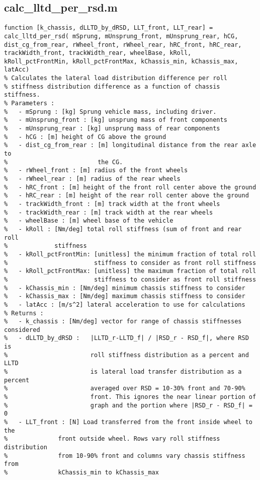 		\subsection{calc\_lltd\_per\_rsd.m}
\begin{lstlisting}
function [k_chassis, dLLTD_by_dRSD, LLT_front, LLT_rear] =  calc_lltd_per_rsd( mSprung, mUnsprung_front, mUnsprung_rear, hCG, dist_cg_from_rear, rWheel_front, rWheel_rear, hRC_front, hRC_rear, trackWidth_front, trackWidth_rear, wheelBase, kRoll, kRoll_pctFrontMin, kRoll_pctFrontMax, kChassis_min, kChassis_max, latAcc)
% Calculates the lateral load distribution difference per roll
% stiffness distribution difference as a function of chassis stiffness.
% Parameters :
%   - mSprung : [kg] Sprung vehicle mass, including driver.
%   - mUnsprung_front : [kg] unsprung mass of front components
%   - mUnsprung_rear : [kg] unsprung mass of rear components
%   - hCG : [m] height of CG above the ground
%   - dist_cg_from_rear : [m] longitudinal distance from the rear axle to
%                         the CG.
%   - rWheel_front : [m] radius of the front wheels
%   - rWheel_rear : [m] radius of the rear wheels
%   - hRC_front : [m] height of the front roll center above the ground
%   - hRC_rear : [m] height of the rear roll center above the ground
%   - trackWidth_front : [m] track width at the front wheels
%   - trackWidth_rear : [m] track width at the rear wheels
%   - wheelBase : [m] wheel base of the vehicle
%   - kRoll : [Nm/deg] total roll stiffness (sum of front and rear roll
%             stiffness
%   - kRoll_pctFrontMin: [unitless] the minimum fraction of total roll
%                        stiffness to consider as front roll stiffness
%   - kRoll_pctFrontMax: [unitless] the maximum fraction of total roll
%                        stiffness to consider as front roll stiffness
%   - kChassis_min : [Nm/deg] minimum chassis stiffness to consider
%   - kChassis_max : [Nm/deg] maximum chassis stiffness to consider
%   - latAcc : [m/s^2] lateral acceleration to use for calculations
% Returns :
%   - k_chassis : [Nm/deg] vector for range of chassis stiffnesses considered
%   - dLLTD_by_dRSD :   |LLTD_r-LLTD_f| / |RSD_r - RSD_f|, where RSD is
%                       roll stiffness distribution as a percent and LLTD
%                       is lateral load transfer distribution as a percent
%                       averaged over RSD = 10-30% front and 70-90%
%                       front. This ignores the near linear portion of
%                       graph and the portion where |RSD_r - RSD_f| = 0
%   - LLT_front : [N] Load transferred from the front inside wheel to the 
%              front outside wheel. Rows vary roll stiffness distribution 
%              from 10-90% front and columns vary chassis stiffness from 
%              kChassis_min to kChassis_max


\end{lstlisting}
